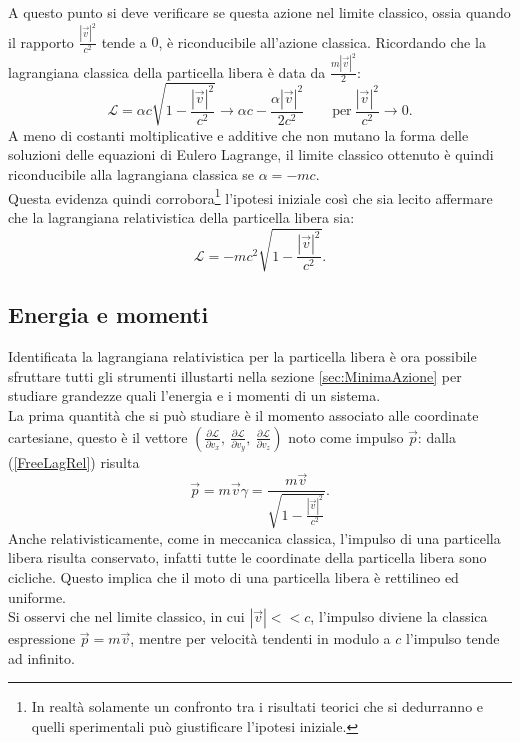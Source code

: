 A questo punto si deve verificare se questa azione nel limite classico, ossia quando il rapporto $\frac{|\vec{v}|^2}{c^2}$ tende a $0$, è riconducibile all'azione classica. Ricordando che la lagrangiana classica della particella libera è data da $\frac{m|\vec{v}|^2}{2} $:
\begin{equation*}
    \mathcal{L} =\alpha c \sqrt{1-\frac{|\vec{v}|^2}{c^2}}\longrightarrow \alpha c - \frac{\alpha |\vec{v}|^2}{2c^2}\qquad \text{per}\ \frac{|\vec{v}|^2}{c^2}\rightarrow 0.
\end{equation*}
A meno di costanti moltiplicative e additive che non mutano la forma delle soluzioni delle equazioni di Eulero Lagrange, il limite classico ottenuto è quindi riconducibile alla lagrangiana classica se $\alpha=-mc$.\\
Questa evidenza quindi corrobora\footnote{In realtà solamente un confronto tra i risultati teorici che si dedurranno e quelli sperimentali può giustificare l'ipotesi iniziale.} l'ipotesi iniziale così che sia lecito affermare che la lagrangiana relativistica della particella libera sia:
\begin{equation}\label{FreeLagRel}
    \mathcal{L} = -mc^2\sqrt{1-\frac{|\vec{v}|^2}{c^2}}.
\end{equation}
\subsection{Energia e momenti}\label{sec:LagRelEnMo}
Identificata la lagrangiana relativistica per la particella libera è ora possibile sfruttare tutti gli strumenti illustarti nella sezione \ref{sec:MinimaAzione} per studiare grandezze quali l'energia e i momenti di un sistema.\\

La prima quantità che si può studiare è il momento associato alle coordinate cartesiane, questo è il vettore  $(\frac{\partial \mathcal{L} }{\partial v_x},\ \frac{\partial \mathcal{L} }{\partial v_y},\ \frac{\partial \mathcal{L} }{\partial v_z})$ noto come impulso $\vec p$: dalla (\ref{FreeLagRel}) risulta
\begin{equation}
    \vec{p}=m\vec{v}\gamma=\frac{m\vec{v}}{\sqrt{1-\frac{|\vec{v}|^2}{c^2}}}.
\end{equation}
Anche relativisticamente, come in meccanica classica, l'impulso di una particella libera risulta conservato, infatti tutte le coordinate della particella libera sono cicliche. Questo implica che il moto di una particella libera è rettilineo ed uniforme.\\
Si osservi che nel limite classico, in cui $|\vec{v}|<<c$, l'impulso diviene la classica espressione $\vec p=m\vec v$, mentre per velocità tendenti in modulo a $c$ l'impulso tende ad infinito.\\

